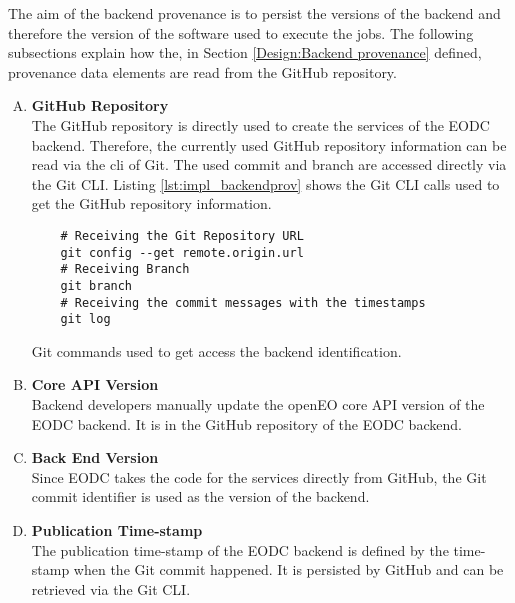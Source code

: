 \documentclass[draft,final]{vutinfth} %
\newenvironment{code}{\captionsetup{type=listing}}{}
\begin{document}
The aim of the backend provenance is to persist the versions of the backend and therefore the version of the software used to execute the jobs. The following subsections explain how the, in Section \ref{Design:Backend provenance} defined, provenance data elements are read from the GitHub repository.  
\begin{enumerate}[(A)]
\item \textbf{GitHub Repository} \\
	The GitHub repository is directly used to create the services of the EODC backend. Therefore, the currently used GitHub repository information can be read via the \gls{cli} of Git. The used commit and branch are accessed directly via the Git CLI. Listing \ref{lst:impl_backendprov} shows the Git CLI calls used to get the GitHub repository information.       

\begin{code}
	\begin{verbatim}
	# Receiving the Git Repository URL
	git config --get remote.origin.url 
	# Receiving Branch
	git branch
	# Receiving the commit messages with the timestamps
	git log 
	\end{verbatim}
	\caption{Git commands used to get access the backend identification.}
	\label{lst:impl_backendprov}
\end{code}

\item \textbf{Core API Version} \\
	Backend developers manually update the openEO core API version of the EODC backend. It is in the GitHub repository of the EODC backend. 

\item \textbf{Back End Version} \\
	Since EODC takes the code for the services directly from GitHub, the Git commit identifier is used as the version of the backend.

\item \textbf{Publication Time-stamp} \\
	The publication time-stamp of the EODC backend is defined by the time-stamp when the Git commit happened. It is persisted by GitHub and can be retrieved via the Git CLI. 
\end{enumerate}
\end{document}
